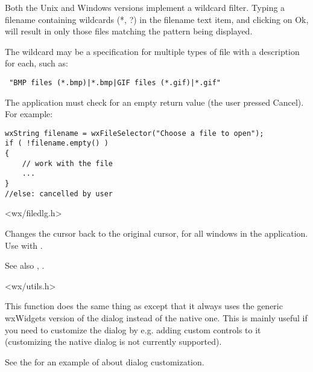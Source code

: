 Both the Unix and Windows versions implement a wildcard filter. Typing a
filename containing wildcards (*, ?) in the filename text item, and
clicking on Ok, will result in only those files matching the pattern being
displayed.

The wildcard may be a specification for multiple types of file
with a description for each, such as:

\begin{verbatim}
 "BMP files (*.bmp)|*.bmp|GIF files (*.gif)|*.gif"
\end{verbatim}

The application must check for an empty return value (the user pressed
Cancel). For example:

\begin{verbatim}
wxString filename = wxFileSelector("Choose a file to open");
if ( !filename.empty() )
{
    // work with the file
    ...
}
//else: cancelled by user
\end{verbatim}


<wx/filedlg.h>


\label{wxendbusycursor}


Changes the cursor back to the original cursor, for all windows in the application.
Use with .

See also , .


<wx/utils.h>


\label{wxgenericaboutbox}


This function does the same thing as  except
that it always uses the generic wxWidgets version of the dialog instead of the
native one. This is mainly useful if you need to customize the dialog by e.g.
adding custom controls to it (customizing the native dialog is not currently
supported).

See the  for an example of about dialog
customization.



